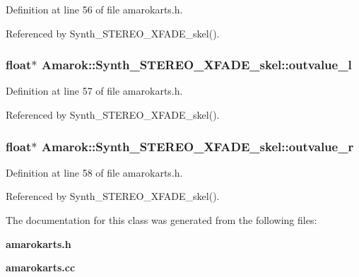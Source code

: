 Definition at line 56 of file amarokarts.h.

Referenced by Synth\_\-STEREO\_\-XFADE\_\-skel().
\subsubsection{\setlength{\rightskip}{0pt plus 5cm}float$\ast$ {\bf Amarok::Synth\_\-STEREO\_\-XFADE\_\-skel::outvalue\_\-l}\hspace{0.3cm}{\tt  [protected]}}\label{classAmarok_1_1Synth__STEREO__XFADE__skel_Amarok_1_1Synth__STEREO__XFADE__skelp4}




Definition at line 57 of file amarokarts.h.

Referenced by Synth\_\-STEREO\_\-XFADE\_\-skel().
\subsubsection{\setlength{\rightskip}{0pt plus 5cm}float$\ast$ {\bf Amarok::Synth\_\-STEREO\_\-XFADE\_\-skel::outvalue\_\-r}\hspace{0.3cm}{\tt  [protected]}}\label{classAmarok_1_1Synth__STEREO__XFADE__skel_Amarok_1_1Synth__STEREO__XFADE__skelp5}




Definition at line 58 of file amarokarts.h.

Referenced by Synth\_\-STEREO\_\-XFADE\_\-skel().

The documentation for this class was generated from the following files:\begin{CompactItemize}
\item 
{\bf amarokarts.h}\item 
{\bf amarokarts.cc}\end{CompactItemize}

